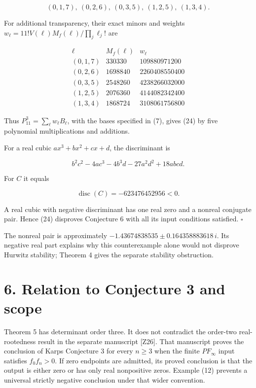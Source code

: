 \documentclass[11pt]{article}
\begin{document}
\[
(0,1,7),\ (0,2,6),\ (0,3,5),\ (1,2,5),\ (1,3,4).
\tag{25}
\]

For additional transparency, their exact minors and weights
\(w_\ell=11!V(\ell)M_f(\ell)/\prod_j\ell_j!\) are

\[
\begin{array}{c|r|r}
\ell&M_f(\ell)&w_\ell\\\hline
(0,1,7)&330330&109880971200\\
(0,2,6)&1698840&2260408550400\\
(0,3,5)&2548260&4238266032000\\
(1,2,5)&2076360&4144082342400\\
(1,3,4)&1868724&3108061756800
\end{array}
\]

Thus \(P_{11}^3=\sum_\ell w_\ell B_\ell\), with the bases specified in
(7), gives (24) by five polynomial multiplications and additions.

For a real cubic \(ax^3+bx^2+cx+d\), the discriminant is

\[
b^2c^2-4ac^3-4b^3d-27a^2d^2+18abcd.
\]

For \(C\) it equals

\[
\operatorname{disc}(C)=-623476452956<0.
\tag{26}
\]

A real cubic with negative discriminant has one real zero and a nonreal
conjugate pair. Hence (24) disproves Conjecture 6 with all its input
conditions satisfied. \(\square\)

The nonreal pair is approximately
\(-1.43674838535\pm0.164358883618\,i\). Its negative real part explains
why this counterexample alone would not disprove Hurwitz stability;
Theorem 4 gives the separate stability obstruction.

\section{6. Relation to Conjecture 3 and
scope}\label{relation-to-conjecture-3-and-scope}

Theorem 5 has determinant order three. It does not contradict the
order-two real-rootedness result in the separate manuscript {[}Z26{]}.
That manuscript proves the conclusion of Karp\textquotesingle s
Conjecture 3 for every \(n\ge3\) when the finite \(PF_\infty\) input
satisfies \(f_0f_n>0\). If zero endpoints are admitted, its proved
conclusion is that the output is either zero or has only real
nonpositive zeros. Example (12) prevents a universal strictly negative
conclusion under that wider convention.
\end{document}
